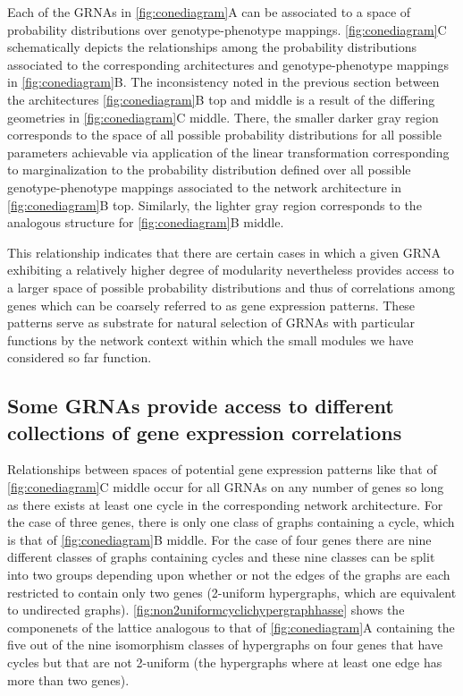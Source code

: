 Each of the GRNAs in \ref{fig:conediagram}A can be associated to a space of probability distributions over genotype-phenotype mappings. \ref{fig:conediagram}C schematically depicts the relationships among the probability distributions associated to the corresponding architectures and genotype-phenotype mappings in \ref{fig:conediagram}B. The inconsistency noted in the previous section between the architectures \ref{fig:conediagram}B top and middle is a result of the differing geometries in \ref{fig:conediagram}C middle. There, the smaller darker gray region corresponds to the space of all possible probability distributions for all possible parameters achievable via application of the linear transformation corresponding to marginalization to the probability distribution defined over all possible genotype-phenotype mappings associated to the network architecture in \ref{fig:conediagram}B top. Similarly, the lighter gray region corresponds to the analogous structure for \ref{fig:conediagram}B middle.

This relationship indicates that there are certain cases in which a given GRNA exhibiting a relatively higher degree of modularity nevertheless provides access to a larger space of possible probability distributions and thus of correlations among genes which can be coarsely referred to as gene expression patterns. These patterns serve as substrate for natural selection of GRNAs with particular functions by the network context within which the small modules we have considered so far function.

\subsection{Some GRNAs provide access to different collections of gene expression correlations}
Relationships between spaces of potential gene expression patterns like that of \ref{fig:conediagram}C middle occur for all GRNAs on any number of genes so long as there exists at least one cycle in the corresponding network architecture. For the case of three genes, there is only one class of graphs containing a cycle, which is that of \ref{fig:conediagram}B middle. For the case of four genes there are nine different classes of graphs containing cycles and these nine classes can be split into two groups depending upon whether or not the edges of the graphs are each restricted to contain only two genes (2-uniform hypergraphs, which are equivalent to undirected graphs). \ref{fig:non2uniformcyclichypergraphhasse} shows the componenets of the lattice analogous to that of \ref{fig:conediagram}A containing the five out of the nine isomorphism classes of hypergraphs on four genes that have cycles but that are not 2-uniform (the hypergraphs where at least one edge has more than two genes).

